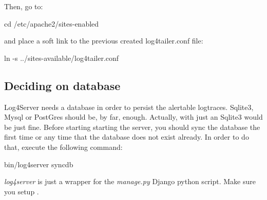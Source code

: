 Then, go to:

\begin{cmd}
    cd /etc/apache2/sites-enabled
\end{cmd}
and place a soft link to the previous created log4tailer.conf file:

\begin{cmd}
    ln -s ../sites-available/log4tailer.conf
\end{cmd}


\subsection{Deciding on database}

Log4Server needs a database in order to persist the alertable logtraces. 
Sqlite3, Mysql or PostGres should be, by far, enough. Actually, with just an
Sqlite3 would be just fine. Before starting starting the server, you should
sync the database the first time or any time that the database does not exist
already. In order to do that, execute the following command:

\begin{cmd}
   bin/log4server syncdb 
\end{cmd}
\emph{log4server} is just a wrapper for the \emph{manage.py} Django python
script. Make sure you setup .

\newpage
